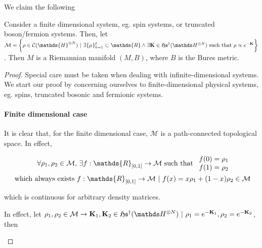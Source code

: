 \documentclass{homework}
\begin{document}
We claim the following

\begin{theo}
    Consider a finite dimensional system, eg. spin systems, or truncated boson/fermion systems. Then, let $\mathcal{M} = \bigg\{ \rho \in \mathcal{C}(\mathds{H}^{\otimes N}) \blanky | \blanky \exists \{\mu\}_{k=1}^{\ell} \subset \mathds{R} \land \exists {\bf K} \in \mathfrak{H}\mathfrak{s}^{\dagger}(\hilbert^{\otimes N}) \textnormal{ such that } \rho \propto e^{-{\bf K}} \bigg\}$. Then $M$ is a Riemannian manifold $(M, B)$, where $B$ is the Bures metric. 
\end{theo}

\begin{proof}

Special care must be taken when dealing with infinite-dimensional systems. We start our proof by concerning ourselves to finite-dimensional physical systems, eg. spins, truncated bosonic and fermionic systems. \\

\paragraph{\textbf{Finite dimensional case}}

It is clear that, for the finite dimensional case, $\mathcal{M}$ is a path-connected topological space. In effect, 

\begin{align*}
\forall \rho_1, \rho_2 \in \mathcal{M}, & \blanky \exists f:\mathds{R}_{[0,1]} \rightarrow \mathcal{M} \textnormal{ such that } \begin{array}{c}
        f(0) = \rho_1 \\
        f(1) = \rho_2
    \end{array} \\
    \textnormal{ which always exists } 
    &f:\mathds{R}_{[0,1]} \rightarrow \mathcal{M} \blanky | \blanky f(x) = x \rho_1 + (1-x) \rho_2 \in \mathcal{M} \\
\end{align*}

which is continuous for arbitrary density matrices.

\begin{tcolorbox}[title = Proof: Path-connectedness in the finite-dimensional case.]
In effect, let $\rho_1, \rho_2 \in \mathcal{M} \rightarrow {{\bf K}}_1, {{\bf K}}_2 \in \mathfrak{H}\mathfrak{s}^{\dagger}(\hilbert^{\otimes N}) \blanky | \blanky \rho_1 = e^{-{\bf K}_1},  \rho_2 = e^{-{\bf K}_2}$, then


\end{tcolorbox}
\end{proof}
\end{document}
